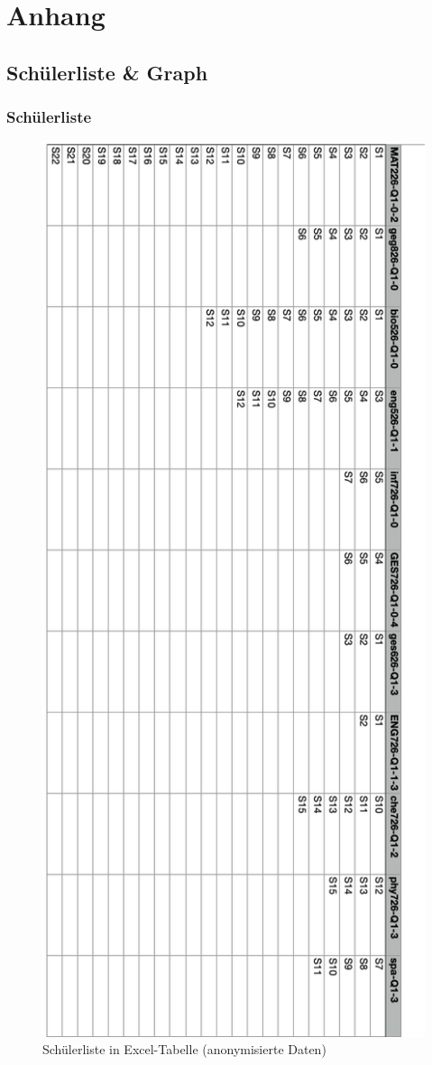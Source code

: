 \newpage
\appendix
\section{Anhang}
\subsection{Schülerliste \& Graph}
\subsubsection*{Schülerliste}
\begin{figure}[H]
    \centering
    \includegraphics[width=0.5\linewidth]{docs/graphics/StudentList1.png}
    \caption{Schülerliste in Excel-Tabelle (anonymisierte Daten)}
    \label{fig:studenList}
\end{figure}
